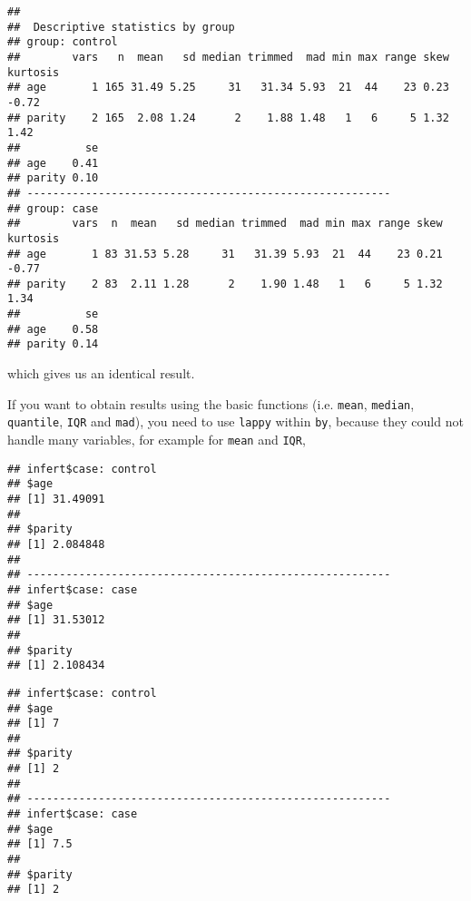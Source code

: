 \documentclass[]{book}
\newenvironment{Shaded}{\begin{snugshade}}{\end{snugshade}}
\newcommand{\KeywordTok}[1]{\textcolor[rgb]{0.13,0.29,0.53}{\textbf{{#1}}}}
\newcommand{\StringTok}[1]{\textcolor[rgb]{0.31,0.60,0.02}{{#1}}}
\newcommand{\NormalTok}[1]{{#1}}
\theoremstyle{definition}
\theoremstyle{definition}
\theoremstyle{remark}
\begin{document}
\begin{verbatim}
## 
##  Descriptive statistics by group 
## group: control
##        vars   n  mean   sd median trimmed  mad min max range skew kurtosis
## age       1 165 31.49 5.25     31   31.34 5.93  21  44    23 0.23    -0.72
## parity    2 165  2.08 1.24      2    1.88 1.48   1   6     5 1.32     1.42
##          se
## age    0.41
## parity 0.10
## -------------------------------------------------------- 
## group: case
##        vars  n  mean   sd median trimmed  mad min max range skew kurtosis
## age       1 83 31.53 5.28     31   31.39 5.93  21  44    23 0.21    -0.77
## parity    2 83  2.11 1.28      2    1.90 1.48   1   6     5 1.32     1.34
##          se
## age    0.58
## parity 0.14
\end{verbatim}

which gives us an identical result.

If you want to obtain results using the basic functions (i.e.
\texttt{mean}, \texttt{median}, \texttt{quantile}, \texttt{IQR} and
\texttt{mad}), you need to use \texttt{lappy} within \texttt{by},
because they could not handle many variables, for example for
\texttt{mean} and \texttt{IQR},

\begin{Shaded}
\end{Shaded}

\begin{verbatim}
## infert$case: control
## $age
## [1] 31.49091
## 
## $parity
## [1] 2.084848
## 
## -------------------------------------------------------- 
## infert$case: case
## $age
## [1] 31.53012
## 
## $parity
## [1] 2.108434
\end{verbatim}

\begin{Shaded}
\end{Shaded}

\begin{verbatim}
## infert$case: control
## $age
## [1] 7
## 
## $parity
## [1] 2
## 
## -------------------------------------------------------- 
## infert$case: case
## $age
## [1] 7.5
## 
## $parity
## [1] 2
\end{verbatim}
\end{document}
